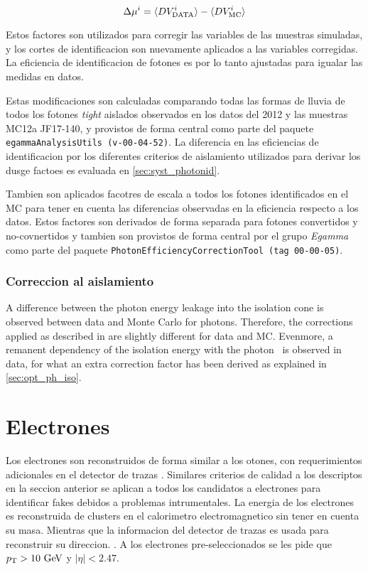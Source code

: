\begin{equation}
  \Delta \mu^i = \langle DV^i_\text{DATA} \rangle - \langle DV^i_\mathrm{MC} \rangle
\end{equation}

Estos factores son utilizados para corregir las variables de las
muestras simuladas, y los cortes de identificacion son nuevamente
aplicados a las variables corregidas. La eficiencia de identificacion
de fotones es por lo tanto ajustadas para igualar las medidas en datos.

Estas modificaciones son calculadas comparando todas las formas de lluvia
de todos los fotones \emph{tight} aislados observados en los datos del 2012
y las muestras MC12a JF17-140, y provistos de forma central como parte del
paquete \texttt{egammaAnalysisUtils (v-00-04-52)}.
La diferencia en las eficiencias de identificacion por los diferentes
criterios de aislamiento utilizados para derivar los dusge factoes es
evaluada en {\Sec} \ref{sec:syst_photonid}.

Tambien son aplicados facotres de escala a todos los fotones identificados
en el MC para tener en cuenta las diferencias observadas en la eficiencia
respecto a los datos. Estos factores son derivados de forma separada para
fotones convertidos y no-covnertidos y tambien son provistos de forma central
por el grupo \emph{Egamma} como parte del paquete
\texttt{PhotonEfficiencyCorrectionTool (tag 00-00-05)}.

\subsubsection{Correccion al aislamiento}

A difference between the photon energy leakage into the isolation cone is
observed between data and Monte Carlo for photons. Therefore, the
corrections applied as described in \cite{Hance:1379530} are slightly
different for data and MC. Evenmore, a remanent dependency of the isolation
energy with the photon \pt\ is observed in data, for what an extra correction factor
has been derived as explained in \Sec \ref{sec:opt_ph_iso}.

\section{Electrones}
\label{sec:elec_obj}

Los electrones son reconstruidos de forma similar a los otones, con
requerimientos adicionales en el detector de trazas \cite{Aad:2011mk}.
Similares criterios de calidad a los descriptos en la seccion anterior
se aplican a todos los candidatos a electrones  para identificar fakes
debidos a problemas intrumentales.
La energia de los electrones es reconstruida de clusters en el calorimetro
electromagnetico sin tener en cuenta su masa. Mientras que la informacion
del detector de trazas es usada para reconstruir su direccion.  \cite{EGScaleTwiki}.
A los electrones pre-seleccionados se les pide que $\pt>10\gev$ y $|\eta|<2.47$.

